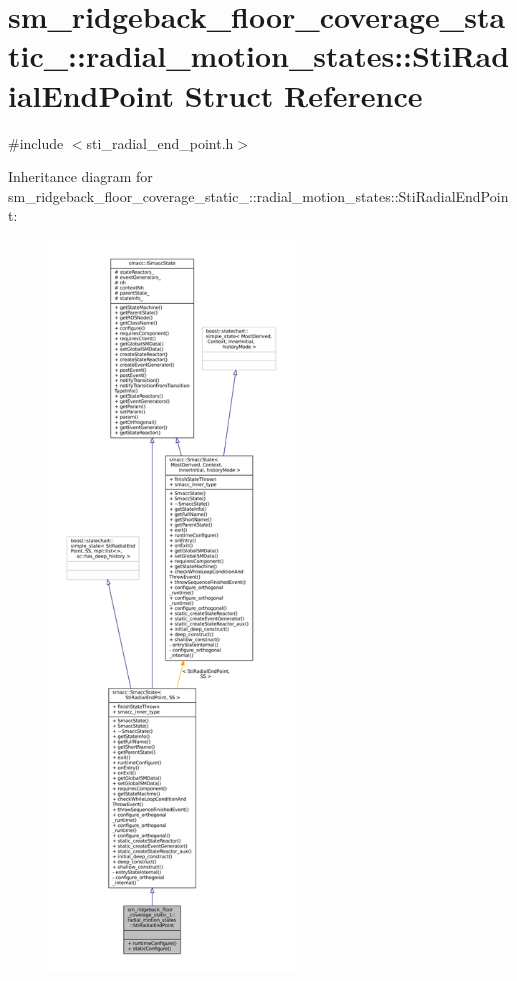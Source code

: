 \hypertarget{structsm__ridgeback__floor__coverage__static__1_1_1radial__motion__states_1_1StiRadialEndPoint}{}\section{sm\+\_\+ridgeback\+\_\+floor\+\_\+coverage\+\_\+static\+\_\+:\+:radial\+\_\+motion\+\_\+states\+:\+:Sti\+Radial\+End\+Point Struct Reference}
\label{structsm__ridgeback__floor__coverage__static__1_1_1radial__motion__states_1_1StiRadialEndPoint}


{\ttfamily \#include $<$sti\+\_\+radial\+\_\+end\+\_\+point.\+h$>$}



Inheritance diagram for sm\+\_\+ridgeback\+\_\+floor\+\_\+coverage\+\_\+static\+\_\+:\+:radial\+\_\+motion\+\_\+states\+:\+:Sti\+Radial\+End\+Point\+:
\nopagebreak
\begin{figure}[H]
\begin{center}
\leavevmode
\includegraphics[height=550pt]{structsm__ridgeback__floor__coverage__static__1_1_1radial__motion__states_1_1StiRadialEndPoint__inherit__graph}
\end{center}
\end{figure}


